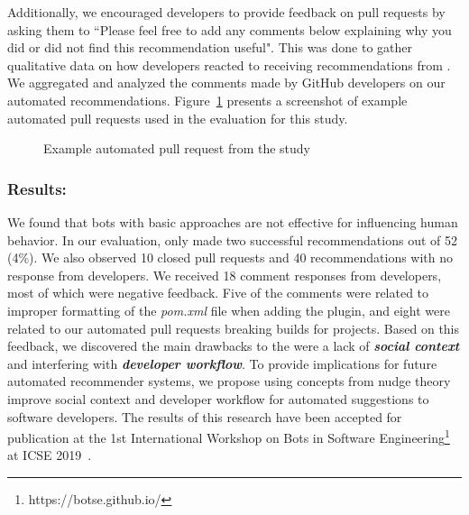 Additionally, we encouraged developers to provide feedback on pull requests by asking them to ``Please feel free to add any comments below explaining why you did or did not find this recommendation useful". This was done to gather qualitative data on how developers reacted to receiving \tele recommendations from \tool. We aggregated and analyzed the comments made by GitHub developers on our automated recommendations. Figure~\ref{fig:botse} presents a screenshot of example automated pull requests used in the evaluation for this study.

\begin{figure}[]
\centering
{}
\caption{Example automated pull request from the \sorry study}
\label{fig:botse}
\end{figure}

\subsubsection{Results:} 

We found that bots with basic approaches are not effective for influencing human behavior. In our evaluation, \tele only made two successful recommendations out of 52 (4\%). We also observed 10 closed pull requests and 40 recommendations with no response from developers. We received 18 comment responses from developers, most of which were negative feedback. Five of the comments were related to improper formatting of the \textit{pom.xml} file when adding the \EP plugin, and eight were related to our automated pull requests breaking builds for projects. Based on this feedback, we discovered the main drawbacks to the \tele were a lack of \textit{\textbf{social context}} and interfering with \textit{\textbf{developer workflow}}. To provide implications for future automated recommender systems, we propose using concepts from nudge theory improve social context and developer workflow for automated suggestions to software developers. The results of this research have been accepted for publication at the 1st International Workshop on Bots in Software Engineering\footnote{https://botse.github.io/} at ICSE 2019~\cite{BotSE}.

